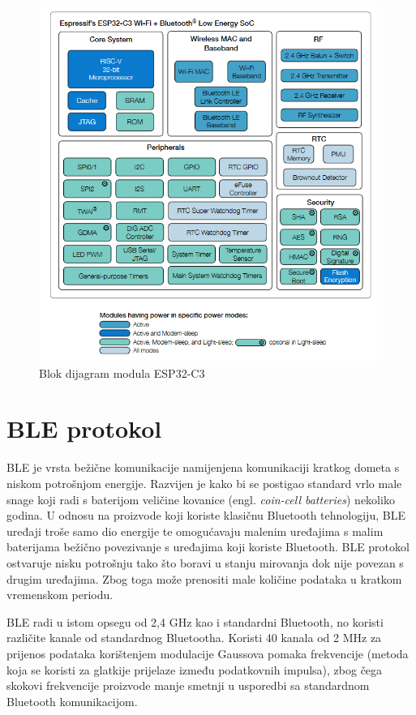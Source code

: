 \begin{figure}[ht]
	\centering
	\includegraphics[scale=0.6]{imgs/esp32block}
	\caption{Blok dijagram modula ESP32-C3 \cite{esp32manual}}
	\label{fig:esp32block}
\end{figure}

\section{BLE protokol}

BLE je vrsta bežične komunikacije namijenjena komunikaciji kratkog dometa s niskom potrošnjom energije. Razvijen je kako bi se postigao standard vrlo male snage koji radi s baterijom veličine kovanice (engl. \textit{coin-cell batteries}) nekoliko godina. U odnosu na proizvode koji koriste klasičnu Bluetooth tehnologiju, BLE uređaji troše samo dio energije te omogućavaju malenim uređajima s malim baterijama bežično povezivanje s uređajima koji koriste Bluetooth. BLE protokol ostvaruje nisku potrošnju tako što boravi u stanju mirovanja dok nije povezan s drugim uređajima. Zbog toga može prenositi male količine podataka u kratkom vremenskom periodu. \cite{blevsbluetooth}

BLE radi u istom opsegu od 2,4 GHz kao i standardni Bluetooth, no koristi različite kanale od standardnog Bluetootha. Koristi 40 kanala od 2 MHz za prijenos podataka korištenjem modulacije Gaussova pomaka frekvencije (metoda koja se koristi za glatkije prijelaze između podatkovnih impulsa), zbog čega skokovi frekvencije proizvode manje smetnji u usporedbi sa standardnom Bluetooth komunikacijom.

